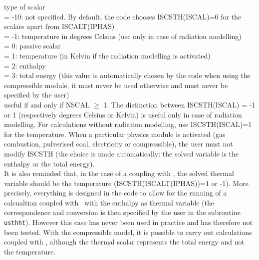 {type of scalar\\
\hspace*{1.3cm}= -10: not specified. By default, the code chooses
ISCSTH(ISCAL)=0 for the scalars apart from ISCALT(IPHAS)\\
\hspace*{1.3cm}= -1: temperature in degrees Celsius (use only in case of
radiation modelling)\\
\hspace*{1.3cm}= 0: passive scalar\\
\hspace*{1.3cm}= 1: temperature (in Kelvin if the radiation modelling is
activated)\\
\hspace*{1.3cm}= 2: enthalpy\\
\hspace*{1.3cm}= 3: total energy (this value is automatically chosen by the code
when using the compressible module, it must never be used otherwise and must
never be specified by the user)\\
useful if and only if NSCAL $\geqslant$ 1. The distinction between
ISCSTH(ISCAL) = -1 or 1 (respectively degrees Celsius or Kelvin) is
useful only in case of radiation modelling. For calculations without
radiation modelling, use ISCSTH(ISCAL)=1 for the temperature. When a
particular physics module is activated (gas combustion, pulverised coal,
electricity or compressible), the user must not modify ISCSTH (the choice is made
automatically: the solved variable is the enthalpy or the total energy).\\
It is also reminded that, in the case of a coupling with
\syrthes, the solved thermal variable should be the temperature
(ISCSTH(ISCALT(IPHAS))=1 or -1).
More precisely, everything is designed in the code to allow for the 
running of a calcualtion coupled with \syrthes\ with the enthalpy as thermal
variable (the correspondence and conversion is then specified by the user in
the subroutine \texttt{usthht}).
However this case has never been used in practice and has therefore not been 
tested. With the compressible model, it is possible to carry out calculations
coupled with \syrthes, although the thermal scalar represents the total
energy and not the temperature.} 

